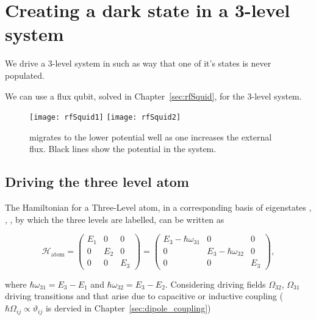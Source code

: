 \section{Creating      a     dark      state      in     a      3-level
  system\label{sec:dark_state}\cite{sillanpaa2009}\cite{abdumalikov2010}}
\begin{framed}\noindent
  We drive a 3-level  system in such as way that one  of it's states is
  never populated.
\end{framed}

We can use  a flux qubit, solved in  Chapter~\ref{sec:rfSquid}, for the
3-level system.

   \begin{figure}[h]
     \texttt{[image: rfSquid1]} \texttt{[image: rfSquid2]}
     \caption{  migrates to  the  lower potential  well as  one
       increases the external  flux. Black lines show  the potential in
       the system.}
     \label{fig:l3-myone}
   \end{figure}

 \subsection{Driving the three level atom\label{subsec:3LevelAtom}}
 The Hamiltonian  for a Three-Level  atom, in a corresponding  basis of
 eigenstates ,  , ,  by which the  three levels
 are labelled, can be written as

  \begin{equation}
    \mathcal{H}_{\text{atom}} = \begin{pmatrix}
      E_1 & 0 & 0\\0& E_2 & 0 \\0&0&E_3
    \end{pmatrix}=\begin{pmatrix}  E_3-\hbar\omega_{31}  &  0  &  0\\0&
      E_3-\hbar\omega_{32} & 0 \\0&0&E_3
    \end{pmatrix},
    \label{rwaAtomicHamil}
  \end{equation}

  \noindent    where   $    \hbar\omega_{31}    =    E_3-E_1   $    and
  $   \hbar\omega_{32}   =   E_3-E_2$.   Considering   driving   fields
  $   \Omega_{32}    $,   $    \Omega_{31}   $    driving   transitions
  \ilra{}  and \ilra{}  that  arise due  to
  capacitive             or              inductive             coupling
  ($   \hbar\Omega_{ij}    \propto   \vartheta_{ij}    $   is    dervied   in
  Chapter~\ref{sec:dipole_coupling})

